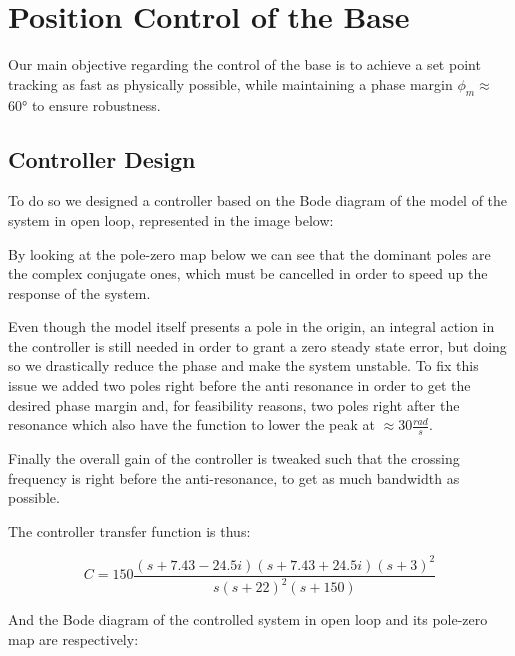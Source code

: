 \chapter{Position Control of the Base}
    \label{cha:position_base}

    Our main objective regarding the control of the base is to achieve a set point tracking as fast as physically possible, while maintaining a phase margin $\phi_m\approx$ 60° to ensure robustness.

    \section{Controller Design}

        To do so we designed a controller based on the Bode diagram of the model of the system in open loop, represented in the image below:


        By looking at the pole-zero map below we can see that the dominant poles are the complex conjugate ones, which must be cancelled in order to speed up the response of the system.


        Even though the model itself presents a pole in the origin, an integral action in the controller is still needed in order to grant a zero steady state error, but doing so we drastically reduce the phase and make the system unstable.
        To fix this issue we added two poles right before the anti resonance in order to get the desired phase margin and, for feasibility reasons, two poles right after the resonance which also have the function to lower the peak at $\approx 30 \frac{rad}{s}$.

        Finally the overall gain of the controller is tweaked such that the crossing frequency is right before the anti-resonance, to get as much bandwidth as possible.

        The controller transfer function is thus:

        \begin{equation}
            C = 150 \frac{(s+7.43-24.5i)(s+7.43+24.5i)(s+3)^2}{s(s+22)^2(s+150)}
        \end{equation}

        And the Bode diagram of the controlled system in open loop and its pole-zero map are respectively:



